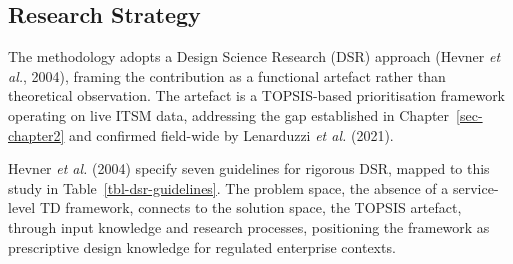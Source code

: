 \documentclass[
  12pt,
  letterpaper,
  12pt,
  oneside,
  english,
  onehalfspacing,
  headsepline]{MastersDoctoralThesis}
\begin{document}
\subsection{Research Strategy}\label{research-strategy}

The methodology adopts a Design Science Research (DSR) approach (Hevner
\emph{et al.}, 2004), framing the contribution as a functional artefact
rather than theoretical observation. The artefact is a TOPSIS-based
prioritisation framework operating on live ITSM data, addressing the gap
established in Chapter~\ref{sec-chapter2} and confirmed field-wide by
Lenarduzzi \emph{et al.} (2021).

Hevner \emph{et al.} (2004) specify seven guidelines for rigorous DSR,
mapped to this study in Table~\ref{tbl-dsr-guidelines}. The problem
space, the absence of a service-level TD framework, connects to the
solution space, the TOPSIS artefact, through input knowledge and
research processes, positioning the framework as prescriptive design
knowledge for regulated enterprise contexts.
\end{document}
